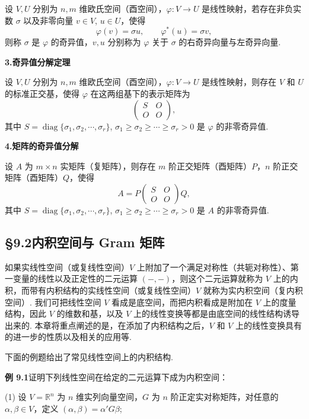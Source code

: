 \documentclass[UTF8, 12pt, fontset=fandol, oneside]{ctexart}
\begin{document}
设 $V,U$ 分别为 $n,m$ 维欧氏空间（酉空间），$\varphi:V\to U$ 是线性映射，若存在非负实数 $\sigma$ 以及非零向量 $v\in V$, $u\in U$，使得
\[
\varphi(v)=\sigma u,\qquad \varphi^*(u)=\sigma v,
\]
则称 $\sigma$ 是 $\varphi$ 的奇异值，$v,u$ 分别称为 $\varphi$ 关于 $\sigma$ 的右奇异向量与左奇异向量.

\noindent\textbf{3.\quad 奇异值分解定理}

设 $V,U$ 分别为 $n,m$ 维欧氏空间（酉空间），$\varphi:V\to U$ 是线性映射，则存在 $V$ 和 $U$ 的标准正交基，使得 $\varphi$ 在这两组基下的表示矩阵为
\[
\begin{pmatrix}
S & O\\
O & O
\end{pmatrix},
\]
其中 $S=\operatorname{diag}\{\sigma_1,\sigma_2,\cdots,\sigma_r\}$, $\sigma_1\ge \sigma_2\ge \cdots\ge \sigma_r>0$ 是 $\varphi$ 的非零奇异值.

\noindent\textbf{4.\quad 矩阵的奇异值分解}

设 $A$ 为 $m\times n$ 实矩阵（复矩阵），则存在 $m$ 阶正交矩阵（酉矩阵）$P$，$n$ 阶正交矩阵（酉矩阵）$Q$，使得
\[
A=P
\begin{pmatrix}
S & O\\
O & O
\end{pmatrix}
Q,
\]
其中 $S=\operatorname{diag}\{\sigma_1,\sigma_2,\cdots,\sigma_r\}$, $\sigma_1\ge \sigma_2\ge \cdots\ge \sigma_r>0$ 是 $A$ 的非零奇异值.

\subsection*{§9.2\quad 内积空间与 Gram 矩阵}

如果实线性空间（或复线性空间）$V$ 上附加了一个满足对称性（共轭对称性）、第一变量的线性以及正定性的二元运算 $(-,-)$，则这个二元运算就称为 $V$ 上的内积，而带有内积结构的实线性空间（或复线性空间）$V$ 就称为实内积空间（复内积空间）. 我们可把线性空间 $V$ 看成是底空间，而把内积看成是附加在 $V$ 上的度量结构，因此 $V$ 的维数和基，以及 $V$ 上的线性变换等都是由底空间的线性结构诱导出来的. 本章将重点阐述的是，在添加了内积结构之后，$V$ 和 $V$ 上的线性变换具有的进一步的性质以及相关的应用等.

下面的例题给出了常见线性空间上的内积结构.

\noindent\textbf{例 9.1}\quad 证明下列线性空间在给定的二元运算下成为内积空间：

(1) 设 $V=\mathbb{R}^n$ 为 $n$ 维实列向量空间，$G$ 为 $n$ 阶正定实对称矩阵，对任意的 $\alpha,\beta\in V$，定义 $(\alpha,\beta)=\alpha'G\beta$;
\end{document}
